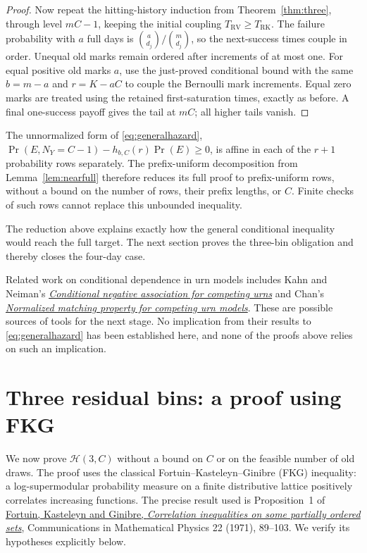 \documentclass[11pt]{article}
\newcommand{\RV}{\mathrm{RV}}
\newcommand{\RK}{\mathrm{RK}}
\begin{document}
\begin{proof}
Now repeat the hitting-history induction from
Theorem~\ref{thm:three}, through level $mC-1$, keeping the initial
coupling $T_\RV\geq T_\RK$. The failure probability with $a$ full
days is $\binom a{d_j}/\binom m{d_j}$, so the next-success times
couple in order. Unequal old marks remain ordered after increments
of at most one. For equal positive old marks $a$, use the just-proved
conditional bound with the same $b=m-a$ and $r=K-aC$ to couple
the Bernoulli mark increments. Equal zero marks are treated using
the retained first-saturation times, exactly as before. A final
one-success payoff gives the tail at $mC$; all higher tails vanish.
\end{proof}

The unnormalized form of \eqref{eq:generalhazard},
$\Pr(E,N_Y=C-1)-h_{b,C}(r)\Pr(E)\geq0$, is affine in each of
the $r+1$ probability rows separately. The prefix-uniform decomposition
from Lemma~\ref{lem:nearfull} therefore reduces its full proof to
prefix-uniform rows, without a bound on the number of rows, their
prefix lengths, or $C$. Finite checks of such rows cannot replace
this unbounded inequality.

The reduction above explains exactly how the general conditional
inequality would reach the full target. The next section proves the
three-bin obligation and thereby closes the four-day case.

Related work on conditional dependence in urn models includes
Kahn and Neiman's
\href{https://arxiv.org/abs/1001.0610}{\emph{Conditional negative association for competing urns}}
and Chan's
\href{https://arxiv.org/abs/2509.06273}{\emph{Normalized matching property for competing urn models}}.
These are possible sources of tools for the next stage. No implication
from their results to \eqref{eq:generalhazard} has been established here,
and none of the proofs above relies on such an implication.

\section{Three residual bins: a proof using FKG}
We now prove $\mathcal H(3,C)$ without a bound on $C$ or on the
feasible number of old draws. The proof uses the classical
Fortuin--Kasteleyn--Ginibre (FKG) inequality: a log-supermodular
probability measure on a finite distributive lattice positively
correlates increasing functions. The precise result used is
Proposition~1 of
\href{https://math.bme.hu/~balint/oktatas/perkolacio/percolation_papers/fortuin_kasteleyn_ginibre.pdf}
{Fortuin, Kasteleyn and Ginibre, \emph{Correlation inequalities on some partially ordered sets}},
Communications in Mathematical Physics 22 (1971), 89--103.
We verify its hypotheses explicitly below.
\end{document}
